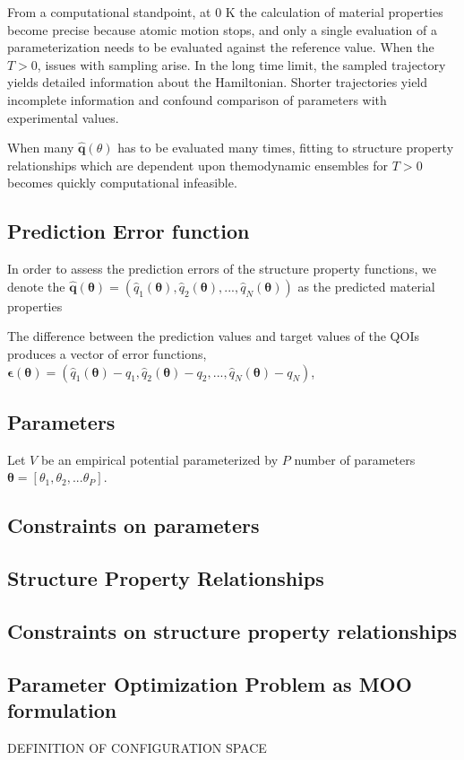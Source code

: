 From a computational standpoint, at $0$ K the calculation of material properties become precise because atomic motion stops, and only a single evaluation of a parameterization needs to be evaluated against the reference value.  When the $T>0$, issues with sampling arise.  In the long time limit, the sampled trajectory yields detailed information about the Hamiltonian.  Shorter trajectories yield incomplete information and confound comparison of parameters with experimental values.

When many $\hat{\bm{q}}(\theta)$ has to be evaluated many times, fitting to structure property relationships which are dependent upon themodynamic ensembles for $T>0$ becomes quickly computational infeasible.

\subsection{Prediction Error function}
In order to assess the prediction errors of the structure property functions, we denote the
      $\hat{\bm{q}}(\bm{\theta})=(
          \hat{q}_1(\bm{\theta}),
          \hat{q}_2(\bm{\theta}),
          ...,
          \hat{q}_N(\bm{\theta}))$
    as the predicted material properties

The difference between the prediction values and target values of the QOIs produces a vector of error functions, $\bm{\epsilon}(\bm{\theta})=(
        \hat{q}_1(\bm{\theta})-q_1,
        \hat{q}_2(\bm{\theta})-q_2,
        ...,
        \hat{q}_N(\bm{\theta})-q_N)$,
\subsection{Parameters}
Let $V$ be an empirical potential parameterized by $P$ number of parameters $\bm{\theta}=[\theta_1,\theta_2,...\theta_P]$.
\subsection{Constraints on parameters}
\subsection{Structure Property Relationships}
\subsection{Constraints on structure property relationships}

\subsection{Parameter Optimization Problem as MOO formulation}
DEFINITION OF CONFIGURATION SPACE


